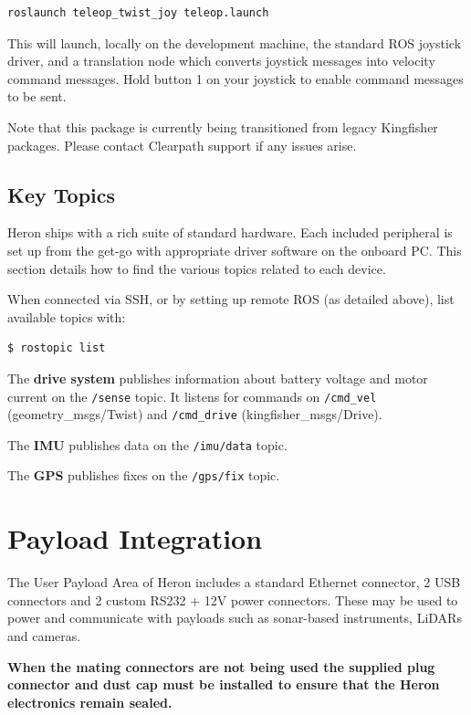 \documentclass[]{clearpath-latex/clearpath-manual}
\begin{document}
\begin{lstlisting}
roslaunch teleop_twist_joy teleop.launch
\end{lstlisting}

This will launch, locally on the development machine, the standard ROS joystick driver, and a translation node which converts joystick messages into velocity command messages. Hold button 1 on your joystick to enable command messages to be sent.

Note that this package is currently being transitioned from legacy Kingfisher packages. Please contact Clearpath support if any issues arise. 

\pagebreak

\subsection{Key Topics}
Heron ships with a rich suite of standard hardware. Each included peripheral is set up from the get-go with appropriate driver software on the onboard PC. This section details how to find the various topics related to each device.

When connected via SSH, or by setting up remote ROS (as detailed above), list available topics with:

\begin{lstlisting}
$ rostopic list
\end{lstlisting}

The \textbf{drive system} publishes information about battery voltage and motor current on the \lstinline{/sense} topic. It listens for commands on \lstinline{/cmd_vel} (geometry\_msgs/Twist) and \lstinline{/cmd_drive} (kingfisher\_msgs/Drive).

The \textbf{IMU} publishes data on the \lstinline{/imu/data} topic.

The \textbf{GPS} publishes fixes on the \lstinline{/gps/fix} topic.



\newpage

\section{Payload Integration}
The User Payload Area of Heron includes a standard Ethernet connector, 2 USB connectors and 2 custom RS232 + 12V power connectors. These may be used to power and communicate with payloads such as sonar-based instruments, LiDARs and cameras.

\textbf{When the mating connectors are not being used the supplied plug connector and dust cap must be installed to ensure that the Heron electronics remain sealed.}
\end{document}
